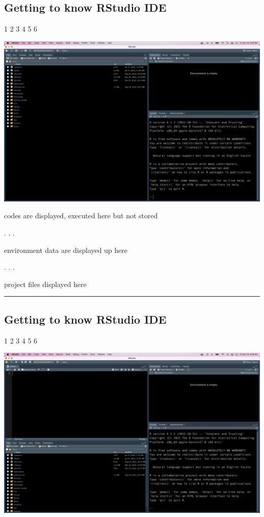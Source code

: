 \documentclass[
  letterpaper,
  DIV=11,
  numbers=noendperiod]{scrartcl}
\begin{document}
\hypertarget{getting-to-know-rstudio-ide}{%
\subsection{Getting to know RStudio
IDE}\label{getting-to-know-rstudio-ide}}

1 {2 3 4 5 6}

\includegraphics{images/rsudio-ide-1.png}

codes are displayed, executed here but not stored

. . .

environment data are displayed up here

. . .

project files displayed here

\begin{center}\rule{0.5\linewidth}{0.5pt}\end{center}

\hypertarget{getting-to-know-rstudio-ide-1}{%
\subsection{Getting to know RStudio
IDE}\label{getting-to-know-rstudio-ide-1}}

1 {2 3 4 5 6}

\includegraphics{images/rstudio-ide-2.png}
\end{document}
